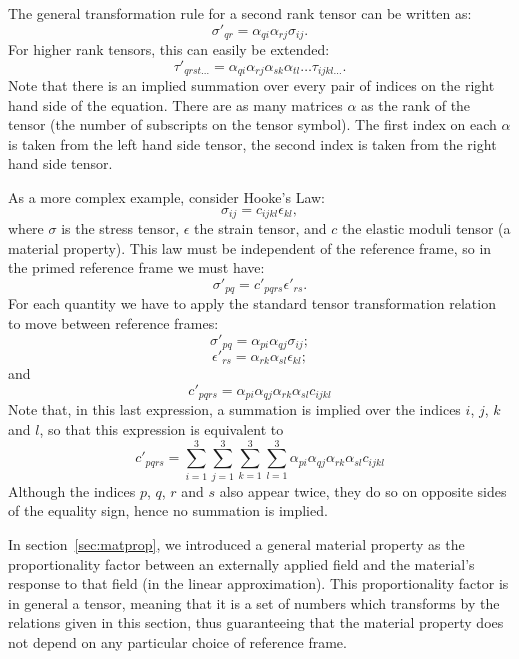 The general transformation rule for a second rank tensor can be written as:
\[
	\sigma'_{qr} = \alpha_{qi}\alpha_{rj}\sigma_{ij}.
\]
For higher rank tensors, this can easily be extended:
\[
	\tau'_{qrst\ldots} = \alpha_{qi}\alpha_{rj}\alpha_{sk}\alpha_{tl}\ldots \tau_{ijkl\ldots}.
\]
Note that there is an implied summation over every pair of indices on the right hand side of the equation.  There are as many matrices $\alpha$ as the rank of the tensor (the number of subscripts on the tensor symbol).  The first index on each $\alpha$ is taken from the left hand side tensor, the second index is taken from the right hand side tensor.

As a more complex example, consider Hooke's Law:
\[
\sigma_{ij}=c_{ijkl}\epsilon_{kl},
\]
where $\sigma$ is the stress tensor, $\epsilon$ the strain tensor, and $c$ the elastic moduli tensor (a 
material property).  This law must be independent of the reference frame, so in the primed reference
frame we must have:
\[
\sigma'_{pq}=c'_{pqrs}\epsilon'_{rs}.
\]
For each quantity we have to apply the standard tensor transformation relation to move between reference
frames:
\[
	\sigma'_{pq} = \alpha_{pi}\alpha_{qj}\sigma_{ij};
\] 
\[
	\epsilon'_{rs} = \alpha_{rk}\alpha_{sl}\epsilon_{kl};
\] 
and
\[
	c'_{pqrs} = \alpha_{pi}\alpha_{qj}\alpha_{rk}\alpha_{sl} c_{ijkl}
\]
Note that, in this last expression, a summation is implied over the indices $i$, $j$, $k$ and $l$, so that this 
expression is equivalent to
\[
c'_{pqrs}=\sum_{i=1}^{3}\sum_{j=1}^{3}\sum_{k=1}^{3}\sum_{l=1}^{3}\alpha_{pi}\alpha_{qj}\alpha_{rk}\alpha_{sl} c_{ijkl}
\]
Although the indices $p$, $q$, $r$ and $s$ also appear twice, they do so on 
opposite sides of the equality sign, hence no summation is implied.

In section~\ref{sec:matprop}, we introduced a general material property as the proportionality factor between an externally applied field and the material's response to that field (in the linear approximation).  This proportionality factor is in general a tensor, meaning that it is a set of numbers which transforms by the relations given in this section, thus guaranteeing that the material property does not depend on any particular choice of reference frame.

